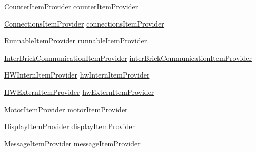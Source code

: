 \begin{DoxyCompactItemize}
\hyperlink{classshootingmachineemfmodel_1_1provider_1_1_counter_item_provider}{Counter\-Item\-Provider} \hyperlink{classshootingmachineemfmodel_1_1provider_1_1_shootingmachineemfmodel_item_provider_adapter_factory_a66df12b1ede3faf4c051e2e72922bbbc}{counter\-Item\-Provider}
\item 
\hyperlink{classshootingmachineemfmodel_1_1provider_1_1_connections_item_provider}{Connections\-Item\-Provider} \hyperlink{classshootingmachineemfmodel_1_1provider_1_1_shootingmachineemfmodel_item_provider_adapter_factory_ab27f91f30f48e178de735cce7a63ac94}{connections\-Item\-Provider}
\item 
\hyperlink{classshootingmachineemfmodel_1_1provider_1_1_runnable_item_provider}{Runnable\-Item\-Provider} \hyperlink{classshootingmachineemfmodel_1_1provider_1_1_shootingmachineemfmodel_item_provider_adapter_factory_adc4176dd757971cb6b379a235a4b91eb}{runnable\-Item\-Provider}
\item 
\hyperlink{classshootingmachineemfmodel_1_1provider_1_1_inter_brick_communication_item_provider}{Inter\-Brick\-Communication\-Item\-Provider} \hyperlink{classshootingmachineemfmodel_1_1provider_1_1_shootingmachineemfmodel_item_provider_adapter_factory_a6b84862a84bce45f885fda3005d52b20}{inter\-Brick\-Communication\-Item\-Provider}
\item 
\hyperlink{classshootingmachineemfmodel_1_1provider_1_1_h_w_intern_item_provider}{H\-W\-Intern\-Item\-Provider} \hyperlink{classshootingmachineemfmodel_1_1provider_1_1_shootingmachineemfmodel_item_provider_adapter_factory_a1aa46d3bffc3396b540d7771314de73e}{hw\-Intern\-Item\-Provider}
\item 
\hyperlink{classshootingmachineemfmodel_1_1provider_1_1_h_w_extern_item_provider}{H\-W\-Extern\-Item\-Provider} \hyperlink{classshootingmachineemfmodel_1_1provider_1_1_shootingmachineemfmodel_item_provider_adapter_factory_a043dd5416233a000b0059b95bc8c6239}{hw\-Extern\-Item\-Provider}
\item 
\hyperlink{classshootingmachineemfmodel_1_1provider_1_1_motor_item_provider}{Motor\-Item\-Provider} \hyperlink{classshootingmachineemfmodel_1_1provider_1_1_shootingmachineemfmodel_item_provider_adapter_factory_a6f78629c961ec98bc5cc5e126dfcd2e4}{motor\-Item\-Provider}
\item 
\hyperlink{classshootingmachineemfmodel_1_1provider_1_1_display_item_provider}{Display\-Item\-Provider} \hyperlink{classshootingmachineemfmodel_1_1provider_1_1_shootingmachineemfmodel_item_provider_adapter_factory_abed64251d753a775ee21b8cf1d23855b}{display\-Item\-Provider}
\item 
\hyperlink{classshootingmachineemfmodel_1_1provider_1_1_message_item_provider}{Message\-Item\-Provider} \hyperlink{classshootingmachineemfmodel_1_1provider_1_1_shootingmachineemfmodel_item_provider_adapter_factory_a5abcc88127ed58f98c7e73dcb79a4a80}{message\-Item\-Provider}
\end{DoxyCompactItemize}
